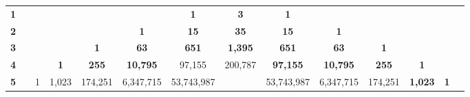 \begin{table}[h!]
\tiny
\begin{tabular}{llllccccccclll}
{\color[HTML]{FF0000} \textbf{1}} &                       &                           &                                & \multicolumn{1}{l}{} & \multicolumn{1}{l}{}               & \cellcolor[HTML]{FCE5CD}\textbf{1}   & \textbf{3}                             & \textbf{1}                              & \multicolumn{1}{l}{}                    & \multicolumn{1}{l}{}                &                                                       &                                    &                                \\
{\color[HTML]{FF0000} \textbf{2}} &                       &                           &                                & \multicolumn{1}{l}{} & \cellcolor[HTML]{FCE5CD}\textbf{1} & \cellcolor[HTML]{CFE2F3}\textbf{15}  & \cellcolor[HTML]{FCE5CD}\textbf{35}    & \textbf{15}                             & \textbf{1}                              & \multicolumn{1}{l}{}                &                                                       &                                    &                                \\
{\color[HTML]{FF0000} \textbf{3}} &                       &                           &                                & \textbf{1}           & \textbf{63}                        & \cellcolor[HTML]{FCE5CD}\textbf{651} & \cellcolor[HTML]{CFE2F3}\textbf{1,395} & \cellcolor[HTML]{FCE5CD}\textbf{651}    & \textbf{63}                             & \textbf{1}                          &                                                       &                                    &                                \\
{\color[HTML]{FF0000} \textbf{4}} &                       &                           & \multicolumn{1}{c}{\textbf{1}} & \textbf{255}         & \textbf{10,795}                    & 97,155                               & \cellcolor[HTML]{FCE5CD}200,787        & \cellcolor[HTML]{CFE2F3}\textbf{97,155} & \cellcolor[HTML]{FCE5CD}\textbf{10,795} & \textbf{255}                        & \multicolumn{1}{c}{\textbf{1}}                        &                                    &                                \\
{\color[HTML]{FF0000} \textbf{5}} &                       & \multicolumn{1}{c}{1}     & \multicolumn{1}{c}{1,023}      & 174,251              & 6,347,715                          & 53,743,987                           & \multicolumn{1}{l}{}                   & \cellcolor[HTML]{FCE5CD}53,743,987      & \cellcolor[HTML]{CFE2F3}6,347,715       & \cellcolor[HTML]{FCE5CD}174,251     & \multicolumn{1}{c}{\textbf{1,023}}                    & \multicolumn{1}{c}{\textbf{1}}     &                                \\

\end{tabular}
\end{table}
